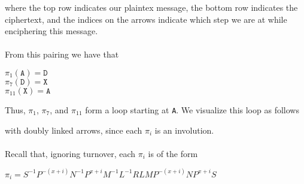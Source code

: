 where the top row indicates our plaintex message, the bottom row
indicates the ciphertext,
and the indices on the arrows indicate which step we are at while enciphering this message.
\\\\From this pairing we have that
\begin{center}
  $\pi_1(\texttt{A}) = {\texttt{D}}$\\
  $\pi_7(\texttt{D}) = {\texttt{X}}$\\
  $\pi_{11}(\texttt{X}) = {\texttt{A}}$\\
\end{center}
Thus, $\pi_1$, $\pi_7$, and $\pi_{11}$ form a loop starting
at \texttt{A}. We visualize this loop as follows
\begin{center}
\end{center}
with doubly linked arrows, since each $\pi_i$ is an involution.
\\\\Recall that, ignoring turnover, each $\pi_i$ is of the form
\begin{center}
  $\pi_i = S^{-1}P^{-(x+i)}N^{-1}P^{x+i}M^{-1}L^{-1}RLMP^{-(x+i)}NP^{x+i}S$
\end{center}

